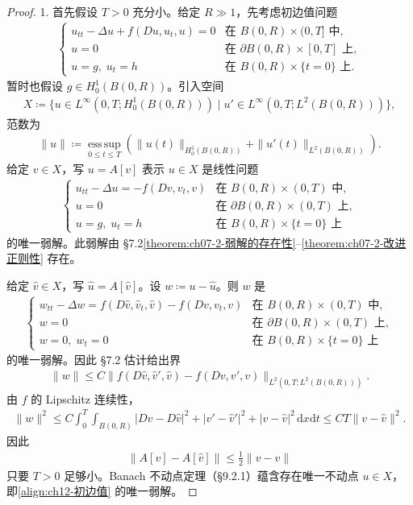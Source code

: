 \documentclass[../../main.tex]{subfiles}
\begin{document}
\begin{proof}
1. 首先假设 $T>0$ 充分小。给定 $R\gg 1$，先考虑初边值问题
\begin{align}
\begin{cases}
u_{tt}-\Delta u+f(Du,u_t,u)=0 & \text{在 } B(0,R)\times(0,T] \text{ 中},\\
u=0 & \text{在 } \partial B(0,R)\times[0,T] \text{ 上},\\
u=g,\;u_t=h & \text{在 } B(0,R)\times\{t=0\} \text{ 上}.
\end{cases}
\label{align:ch12-初边值}
\end{align}
暂时也假设 $g\in H^1_0(B(0,R))$。引入空间
\begin{align*}
X\coloneqq\{u\in L^\infty(0,T;H^1_0(B(0,R)))\mid u'\in L^\infty(0,T;L^2(B(0,R)))\},
\end{align*}
范数为
\begin{align*}
\|u\|\coloneqq\operatorname*{ess\,sup}_{0\leqslant t\leqslant T}(\|u(t)\|_{H^1_0(B(0,R))}+\|u'(t)\|_{L^2(B(0,R))}).
\end{align*}
给定 $v\in X$，写 $u=A[v]$ 表示 $u\in X$ 是线性问题
\begin{align}
\begin{cases}
u_{tt}-\Delta u=-f(Dv,v_t,v) & \text{在 } B(0,R)\times(0,T) \text{ 中},\\
u=0 & \text{在 } \partial B(0,R)\times(0,T) \text{ 上},\\
u=g,\;u_t=h & \text{在 } B(0,R)\times\{t=0\} \text{ 上}
\end{cases}
\label{align:ch12-线性问题}
\end{align}
的唯一弱解。此弱解由 \S7.2\cref{theorem:ch07-2-弱解的存在性}--\cref{theorem:ch07-2-改进正则性} 存在。

给定 $\widehat{v}\in X$，写 $\widehat{u}=A[\widehat{v}]$。设 $w\coloneqq u-\widehat{u}$。则 $w$ 是
\begin{align*}
\begin{cases}
w_{tt}-\Delta w=f(D\widehat{v},\widehat{v}_t,\widehat{v})-f(Dv,v_t,v) & \text{在 } B(0,R)\times(0,T) \text{ 中},\\
w=0 & \text{在 } \partial B(0,R)\times(0,T) \text{ 上},\\
w=0,\;w_t=0 & \text{在 } B(0,R)\times\{t=0\} \text{ 上}
\end{cases}
\end{align*}
的唯一弱解。因此 \S7.2 估计给出界
\begin{align*}
\|w\|\leqslant C\|f(D\widehat{v},\widehat{v}',\widehat{v})-f(Dv,v',v)\|_{L^2(0,T;L^2(B(0,R)))}.
\end{align*}
由 $f$ 的 Lipschitz 连续性，
\begin{align*}
\|w\|^2\leqslant C\int_0^T\int_{B(0,R)}|Dv-D\widehat{v}|^2+|v'-\widehat{v}'|^2+|v-\widehat{v}|^2\,\mathrm{d}x\mathrm{d}t\leqslant CT\|v-\widehat{v}\|^2.
\end{align*}
因此
\begin{align*}
\|A[v]-A[\widehat{v}]\|\leqslant\frac{1}{2}\|v-\widehat{v}\|
\end{align*}
只要 $T>0$ 足够小。Banach 不动点定理（\S9.2.1）蕴含存在唯一不动点 $u\in X$，即\eqref{align:ch12-初边值} 的唯一弱解。


\end{proof}
\end{document}
